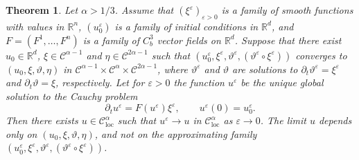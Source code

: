 \documentclass[a4paper,11pt]{article}
\newcommand{\tmop}[1]{\ensuremath{\operatorname{#1}}}
\newtheorem{theorem}{Theorem}[section]
\theoremstyle{remark}
\newcommand{\R}{\mathbb{R}}
\newcommand{\CC}{\ensuremath{\mathscr{C}}}
\newcommand{\reso}{\,\mathord{\circ}\,}
\begin{document}
\begin{theorem}\label{theorem:rde existence uniqueness}
  Let $\alpha >1/3$. Assume that $(\xi^{\varepsilon} )_{\varepsilon >0}$ is a family of smooth functions with
  values in $\mathbb{R}^{n}$, $(u^\varepsilon_0)$ is a family of initial conditions in $\R^d$, and $F = (F^1,\dots, F^n)$ is a family of $C^{3}_{b}$ vector
  fields on $\mathbb{R}^{d}$. Suppose that there exist $u_0 \in \R^d$, $\xi \in \CC^{\alpha -1}$ and $\eta \in \CC^{2 \alpha -1}$ such that $(u_0^\varepsilon, \xi^{\varepsilon} , \vartheta^\varepsilon, (\vartheta^{\varepsilon} \reso   \xi^{\varepsilon} ) )$ converges to $(u_0, \xi , \vartheta, \eta )$ in $\CC^{\alpha -1} \times \CC^\alpha \times \CC^{2 \alpha -1}$, where
  $\vartheta^{\varepsilon}$ and $\vartheta$ are solutions to $\partial_{t}  \vartheta^{\varepsilon} = \xi^{\varepsilon}$ and $\partial_t \vartheta = \xi$, respectively. Let for $\varepsilon >0$ the function $u^{\varepsilon}$ be the
  unique global solution to the Cauchy problem
  \[
     \partial_{t} u^{\varepsilon} =F ( u^{\varepsilon} ) \xi^{\varepsilon} , \hspace{2em} u^{\varepsilon} ( 0 ) =u^\varepsilon_{0} .
  \]
  Then there exists $u \in \CC^{\alpha}_\mathrm{loc}$ such that $u^{\varepsilon} \rightarrow u$ in $\CC^{\alpha}_{\tmop{loc}}$ as $\varepsilon \rightarrow 0$. The limit $u$ depends only on $( u_{0} , \xi , \vartheta , \eta )$, and not on the approximating family $(u_0^\varepsilon, \xi^{\varepsilon} , \vartheta^\varepsilon,  ( \vartheta^{\varepsilon} \reso   \xi^{\varepsilon} ) )$.
\end{theorem}
\end{document}
